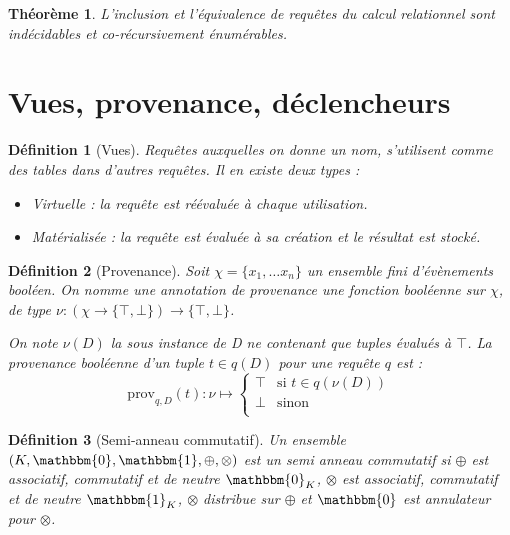 \documentclass[landscape]{article}
\newcommand{\1}{\mathbbm{1}}
\newcommand{\0}{\mathbbm{0}}
\newtheorem{theo}{Théorème}
\newtheorem{defi}{Définition}
\begin{document}
\begin{multicols}{2}
    \begin{theo} L'inclusion et l'équivalence de requêtes du calcul relationnel
        sont indécidables et co-récursivement énumérables.
    \end{theo}

    \section{Vues, provenance, déclencheurs}

    \begin{defi}[Vues] Requêtes auxquelles on donne un nom, s'utilisent comme
        des tables dans d'autres requêtes. Il en existe deux types :\begin{itemize}
            \item Virtuelle : la requête est réévaluée à chaque utilisation.
            \item Matérialisée : la requête est évaluée à sa création et le résultat
                est stocké.
        \end{itemize}
    \end{defi}

    \begin{defi}[Provenance]
        Soit $\chi = \{x_1, \ldots x_n\}$ un ensemble fini d'évènements booléen.
        On nomme une annotation de provenance une fonction booléenne sur $\chi$,
        de type $\nu : (\chi \rightarrow \{\top,\bot\})\rightarrow \{\top,\bot\}$.

        On note $\nu(D)$ la sous instance de D ne contenant que tuples évalués à
        $\top$. La provenance booléenne d'un tuple $t\in q(D)$ pour une requête
        $q$ est :
        \[ \text{prov}_{q,D}(t) : \nu\mapsto\left\{\begin{array}{cl}
            \top & \text{si } t\in q(\nu(D)) \\
            \bot & \text{sinon} \\
        \end{array}\right.\]
    \end{defi}

    \begin{defi}[Semi-anneau commutatif] Un ensemble $(K, \0, \1, \oplus, \otimes)$
        est un semi anneau commutatif si $\oplus$ est associatif, commutatif et
        de neutre $\0_K$, $\otimes$ est associatif, commutatif et de neutre
        $\1_K$, $\otimes$ distribue sur $\oplus$ et $\0$ est annulateur pour
        $\otimes$.
    \end{defi}


\end{multicols}
\end{document}
